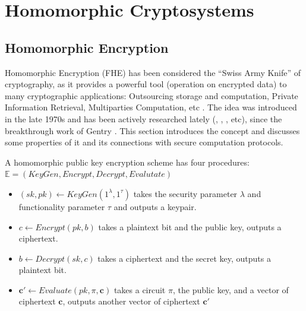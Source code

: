 
\section{Homomorphic Cryptosystems}
\label{sec:defHomo}

\subsection{Homomorphic Encryption}
Homomorphic Encryption (FHE) has been considered the ``Swiss Army Knife''
of cryptography, as it provides a powerful tool (operation on encrypted data) to
many cryptographic applications: Outsourcing storage and computation, Private
Information Retrieval, Multiparties Computation, etc . The idea was introduced
in the late 1970s \cite{rivest1978data} and has been actively researched lately
(\cite{smart2014fully}, \cite{van2010fully} , \cite{stehle2010faster}
\cite{gentry2013homomorphic}, etc), since the breakthrough work of Gentry
\cite{homenc}. This section introduces the concept and discusses some properties of it
and its connections with secure computation protocols.

\begin{definition}
  [Syntax]A homomorphic public key encryption scheme has four procedures:
  \(\mathbb{E} = (KeyGen, Encrypt, Decrypt, Evalutate)\)
  \begin{itemize}
  \item \((sk,pk) \gets KeyGen(1^{\lambda},1^{\tau})\) takes the security
    parameter \(\lambda\) and functionality parameter \(\tau\) and outputs a
    keypair.
  \item \(c \gets Encrypt(pk, b)\) takes a plaintext bit and the public key,
    outputs a ciphertext.
  \item \(b \gets Decrypt(sk, c)\) takes a ciphertext and the secret key,
    outputs a plaintext bit.
  \item \(\mathbf{c}' \gets Evaluate(pk, \pi, \mathbf{c})\) takes a circuit
    \(\pi\), the public key, and a vector of ciphertext \(\mathbf{c}\), outputs
    another vector of ciphertext \(\mathbf{c}'\)
  \end{itemize}
\end{definition}

